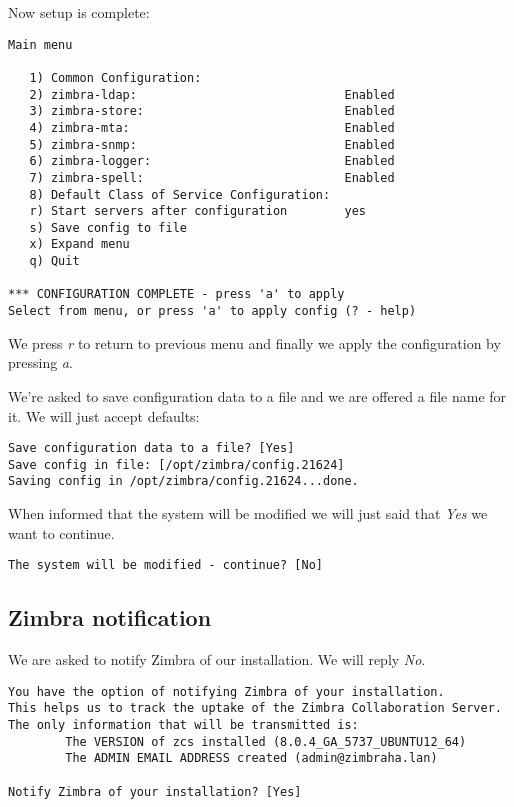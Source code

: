 Now setup is complete:
\begin{verbatim}
Main menu

   1) Common Configuration:                                                  
   2) zimbra-ldap:                             Enabled                       
   3) zimbra-store:                            Enabled                       
   4) zimbra-mta:                              Enabled                       
   5) zimbra-snmp:                             Enabled                       
   6) zimbra-logger:                           Enabled                       
   7) zimbra-spell:                            Enabled                       
   8) Default Class of Service Configuration:                                
   r) Start servers after configuration        yes                           
   s) Save config to file                                                    
   x) Expand menu                                                            
   q) Quit                                    

*** CONFIGURATION COMPLETE - press 'a' to apply
Select from menu, or press 'a' to apply config (? - help) 

\end{verbatim}


We press \textit{r} to return to previous menu and finally we apply the configuration by pressing \textit{a}.

We're asked to save configuration data to a file and we are offered a file name for it. We will just accept defaults:
\begin{verbatim}
Save configuration data to a file? [Yes] 
Save config in file: [/opt/zimbra/config.21624] 
Saving config in /opt/zimbra/config.21624...done.
\end{verbatim}

When informed that the system will be modified we will just said that \textit{Yes} we want to continue.

\begin{verbatim}
The system will be modified - continue? [No] 
\end{verbatim}

\subsection {Zimbra notification}
We are asked to notify Zimbra of our installation. We will reply \textit{No}.

\begin{verbatim}
You have the option of notifying Zimbra of your installation.
This helps us to track the uptake of the Zimbra Collaboration Server.
The only information that will be transmitted is:
        The VERSION of zcs installed (8.0.4_GA_5737_UBUNTU12_64)
        The ADMIN EMAIL ADDRESS created (admin@zimbraha.lan)

Notify Zimbra of your installation? [Yes]
\end{verbatim}

